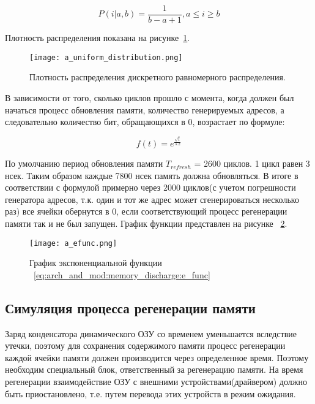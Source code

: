 \begin{equation}
  \label{eq:arch_and_mod:memory_discharge:uniform_func}
  P(i|a,b) = \frac{1}
           {b-a+1}, a \le i \ge b
\end{equation}

Плотность распределения показана на рисунке~\ref{fig:domain:tests:uniform_distribution}.

\begin{figure}[ht]
\centering
  \texttt{[image: a\_uniform\_distribution.png]}  
  \caption{ Плотность распределения дискретного равномерного распределения. }
  \label{fig:domain:tests:uniform_distribution}
\end{figure}

В зависимости от того, сколько циклов прошло с момента, когда должен был начаться процесс обновления памяти, количество генерируемых адресов, а следовательно количество бит, обращающихся в 0, возрастает по формуле:

\begin{equation}
  \label{eq:arch_and_mod:memory_discharge:e_func}
  f(t) = e^{\frac{\sqrt{t}}
           {5.2}}
\end{equation}

По умолчанию период обновления памяти $T_{refresh}$ = 2600 циклов. 1 цикл равен 3 нсек. Таким образом каждые 7800 нсек память должна обновляться. В итоге в соответствии с формулой примерно через 2000 циклов(с учетом погрешности генератора адресов, т.к. один и тот же адрес может сгенерироваться несколько раз) все ячейки обернутся в 0, если соответствующий процесс регенерации памяти так и не был запущен. График функции представлен на рисунке ~\ref{fig:domain:tests:efunc_grafic}.

\begin{figure}[ht]
\centering
  \texttt{[image: a\_efunc.png]}  
  \caption{ График экспоненциальной функции ~\ref{eq:arch_and_mod:memory_discharge:e_func} }
  \label{fig:domain:tests:efunc_grafic}
\end{figure}

\subsection{Симуляция процесса регенерации памяти}
\label{sub:arch_and_mod:memory_refresh}

Заряд конденсатора динамического ОЗУ со временем уменьшается вследствие утечки, поэтому для сохранения содержимого памяти процесс регенерации каждой ячейки памяти должен производится через определенное время. Поэтому необходим специальный блок, ответственный за регенерацию памяти. На время регенерации взаимодействие ОЗУ с внешними устройствами(драйвером) должно быть приостановлено, т.е. путем перевода этих устройств в режим ожидания.

